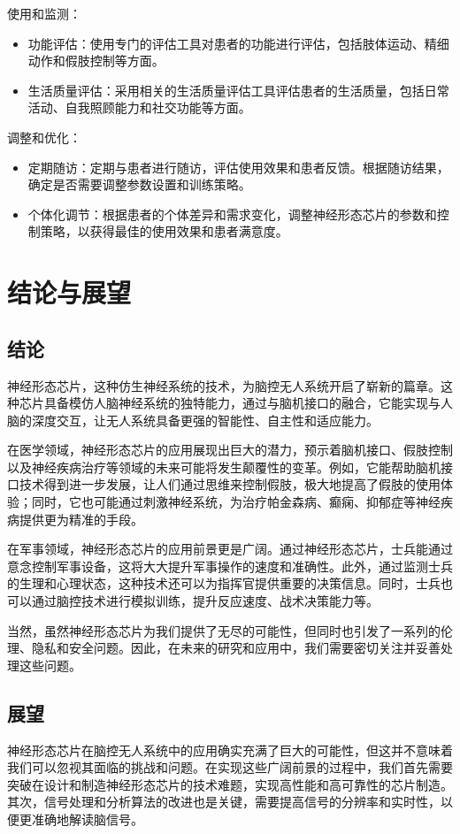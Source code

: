 \documentclass{thuemp}
\begin{document}
{\heiti 使用和监测：}
\begin{itemize}
	\item 功能评估：使用专门的评估工具对患者的功能进行评估，包括肢体运动、精细动作和假肢控制等方面。
	\item 生活质量评估：采用相关的生活质量评估工具评估患者的生活质量，包括日常活动、自我照顾能力和社交功能等方面。
\end{itemize}

{\heiti 调整和优化：}
\begin{itemize}
	\item 定期随访：定期与患者进行随访，评估使用效果和患者反馈。根据随访结果，确定是否需要调整参数设置和训练策略。
	\item 个体化调节：根据患者的个体差异和需求变化，调整神经形态芯片的参数和控制策略，以获得最佳的使用效果和患者满意度。
\end{itemize}

\section{结论与展望}
\subsection{结论}
神经形态芯片，这种仿生神经系统的技术，为脑控无人系统开启了崭新的篇章。这种芯片具备模仿人脑神经系统的独特能力，通过与脑机接口的融合，它能实现与人脑的深度交互，让无人系统具备更强的智能性、自主性和适应能力。

在医学领域，神经形态芯片的应用展现出巨大的潜力，预示着脑机接口、假肢控制以及神经疾病治疗等领域的未来可能将发生颠覆性的变革。例如，它能帮助脑机接口技术得到进一步发展，让人们通过思维来控制假肢，极大地提高了假肢的使用体验；同时，它也可能通过刺激神经系统，为治疗帕金森病、癫痫、抑郁症等神经疾病提供更为精准的手段。

在军事领域，神经形态芯片的应用前景更是广阔。通过神经形态芯片，士兵能通过意念控制军事设备，这将大大提升军事操作的速度和准确性。此外，通过监测士兵的生理和心理状态，这种技术还可以为指挥官提供重要的决策信息。同时，士兵也可以通过脑控技术进行模拟训练，提升反应速度、战术决策能力等。

当然，虽然神经形态芯片为我们提供了无尽的可能性，但同时也引发了一系列的伦理、隐私和安全问题。因此，在未来的研究和应用中，我们需要密切关注并妥善处理这些问题。

\subsection{展望}
神经形态芯片在脑控无人系统中的应用确实充满了巨大的可能性，但这并不意味着我们可以忽视其面临的挑战和问题。在实现这些广阔前景的过程中，我们首先需要突破在设计和制造神经形态芯片的技术难题，实现高性能和高可靠性的芯片制造。其次，信号处理和分析算法的改进也是关键，需要提高信号的分辨率和实时性，以便更准确地解读脑信号。
\end{document}
